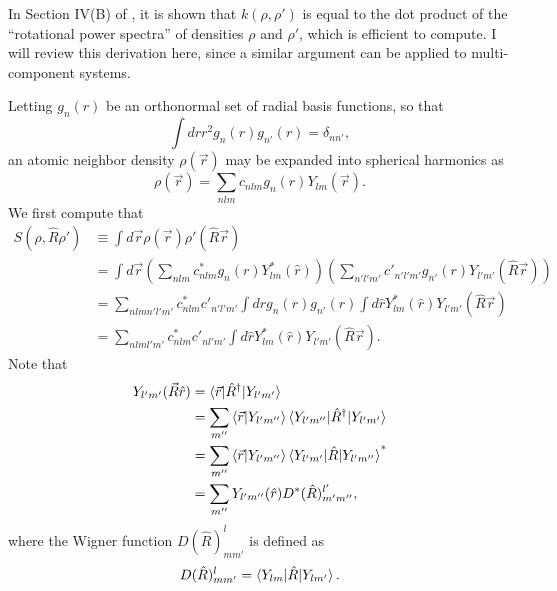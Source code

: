 \documentclass[%
preprint,
amsmath,amssymb,
aps,
]{revtex4-1}
\begin{document}
In Section IV(B) of \cite{bartok2013representing}, it is shown that $k(\rho, \rho')$ is equal to the dot product of the ``rotational power spectra'' of densities $\rho$ and $\rho'$, which is efficient to compute. I will review this derivation here, since a similar argument can be applied to multi-component systems.

Letting $g_n(r)$ be an orthonormal set of radial basis functions, so that
\begin{equation}
\int dr r^2 g_n(r) g_{n'}(r) = \delta_{n n'},
\end{equation}
an atomic neighbor density $\rho(\vec{r})$ may be expanded into spherical harmonics as
\begin{equation}
\rho(\vec{r}) = \sum_{n l m} c_{n l m} g_n(r) Y_{l m} (\vec{r}).
\end{equation}
We first compute that
\begin{equation} \label{S_eq}
\begin{split}
   S(\rho, \hat{R} \rho') &\equiv \int d\vec{r} \rho(\vec{r}) \rho'(\hat{R} \vec{r}) \\
   &= \int d\vec{r} \left(\sum_{n l m} c_{n l m}^* g_n(r)Y_{l m}^*(\hat{r}) \right)\left(\sum_{n' l' m'} c'_{n' l' m'} g_{n'}(r)Y_{l' m'}(\hat{R} \vec{r}) \right) \\
   &= \sum_{n l m n' l' m'} c^*_{n l m} c'_{n' l' m'} \int dr g_n(r) g_{n'}(r) \int d\hat{r} Y^*_{l m}(\hat{r}) Y_{l' m'}(\hat{R} \vec{r}) \\
   &= \sum_{n l m l' m'} c^*_{n l m} c'_{n l' m'} \int d\hat{r} Y^*_{l m}(\hat{r}) Y_{l' m'} (\hat{R} \vec{r}).
\end{split}
\end{equation}
Note that
\begin{equation}
    \begin{split}
Y_{l' m'}(\vec{R} \hat{r}) &= \braket{\vec{r} | \hat{R}^\dagger | Y_{l' m'}} \\
&= \sum_{m''} \braket{\vec{r} | Y_{l' m''}} \braket{Y_{l' m''} | \hat{R}^\dagger | Y_{l' m'}} \\
&= \sum_{m''} \braket{\vec{r} | Y_{l' m''}} \braket{Y_{l' m'} | \hat{R} | Y_{l' m''}}^* \\
&= \sum_{m''} Y_{l' m''}(\hat{r}) D^*(\hat{R})_{m' m''}^{l'},
    \end{split}
\end{equation}
where the Wigner function $D(\hat{R})_{m m'}^{l}$ is defined as
\begin{equation}
D(\hat{R})_{m m'}^{l} = \braket{Y_{l m} | \hat{R} | Y_{l m'}}.
\end{equation}
\end{document}
